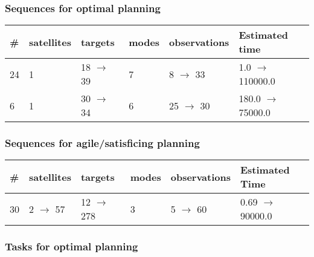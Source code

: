\documentclass{article}
\begin{document}
                            \subsubsection*{Sequences for optimal planning}

                            \begin{center}
                            \begin{tabular}{@{}l|l|l|l|l|l@{}}
                            \# & satellites & targets & modes & observations & Estimated time\\\midrule
                            24&1&18 $\rightarrow$ 39&7&8 $\rightarrow$ 33&1.0 $\rightarrow$ 110000.0\\
6&1&30 $\rightarrow$ 34&6&25 $\rightarrow$ 30&180.0 $\rightarrow$ 75000.0
                            \end{tabular}
                            \end{center}
                    
                         \subsubsection*{Sequences for agile/satisficing planning}

                        \begin{center}
                        \begin{tabular}{@{}l|l|l|l|l|l@{}}
                        \# & satellites & targets & modes & observations & Estimated Time\\\midrule
                        30&2 $\rightarrow$ 57&12 $\rightarrow$ 278&3&5 $\rightarrow$ 60&0.69 $\rightarrow$ 90000.0
                        \end{tabular}
                        \end{center}
                    
                                \subsubsection*{Tasks for optimal planning}
                                
\end{document}
